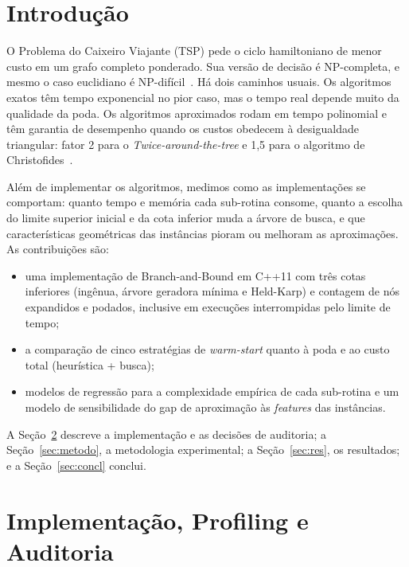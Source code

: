 \documentclass[12pt]{article}
\begin{document}
\section{Introdução}

O Problema do Caixeiro Viajante (TSP) pede o ciclo hamiltoniano de menor custo em um
grafo completo ponderado. Sua versão de decisão é NP-completa, e mesmo o caso
euclidiano é NP-difícil~\cite{applegate2006}. Há dois caminhos usuais. Os algoritmos
exatos têm tempo exponencial no pior caso, mas o tempo real depende muito da qualidade
da poda. Os algoritmos aproximados rodam em tempo polinomial e têm garantia de
desempenho quando os custos obedecem à desigualdade triangular: fator 2 para o
\textit{Twice-around-the-tree} e 1{,}5 para o algoritmo de
Christofides~\cite{christofides1976}.

Além de implementar os algoritmos, medimos como as implementações se comportam: quanto
tempo e memória cada sub-rotina consome, quanto a escolha do limite superior inicial e
da cota inferior muda a árvore de busca, e que características geométricas das
instâncias pioram ou melhoram as aproximações. As contribuições são:
\begin{itemize}
  \item uma implementação de Branch-and-Bound em C++11 com três cotas inferiores
        (ingênua, árvore geradora mínima e Held-Karp) e contagem de nós
        expandidos e podados, inclusive em execuções interrompidas pelo limite de tempo;
  \item a comparação de cinco estratégias de \textit{warm-start} quanto à poda e ao
        custo total (heurística + busca);
  \item modelos de regressão para a complexidade empírica de cada sub-rotina e um
        modelo de sensibilidade do gap de aproximação às \textit{features} das instâncias.
\end{itemize}

A Seção~\ref{sec:impl} descreve a implementação e as decisões de auditoria; a
Seção~\ref{sec:metodo}, a metodologia experimental; a Seção~\ref{sec:res}, os resultados;
e a Seção~\ref{sec:concl} conclui.

\section{Implementação, Profiling e Auditoria}\label{sec:impl}
\end{document}
